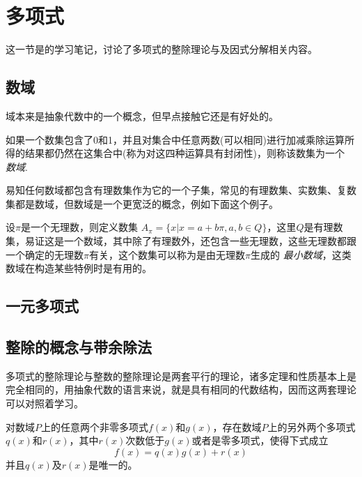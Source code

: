 
\section{多项式}
\label{sec:polynome}

这一节是\cite{advanced-algebra}的学习笔记，讨论了多项式的整除理论与及因式分解相关内容。

\subsection{数域}
\label{sec:number-field}

域本来是抽象代数中的一个概念，但早点接触它还是有好处的。

\begin{definition}
  如果一个数集包含了0和1，并且对集合中任意两数(可以相同)进行加减乘除运算所得的结果都仍然在这集合中(称为对这四种运算具有封闭性)，则称该数集为一个 \emph{数域}.
\end{definition}

易知任何数域都包含有理数集作为它的一个子集，常见的有理数集、实数集、复数集都是数域，但数域是一个更宽泛的概念，例如下面这个例子。

\begin{example}
  设$\pi$是一个无理数，则定义数集 $A_{\pi} = \{x|x=a+b\pi,a,b\in Q\}$，这里$Q$是有理数集，易证这是一个数域，其中除了有理数外，还包含一些无理数，这些无理数都跟一个确定的无理数$\pi$有关，这个数集可以称为是由无理数$\pi$生成的 \emph{最小数域}，这类数域在构造某些特例时是有用的。
\end{example}

\subsection{一元多项式}
\label{sec:polynome-with-one-variable}



\subsection{整除的概念与带余除法}
\label{sec:polynome-integer-division-and-devision-with-remainder}

多项式的整除理论与整数的整除理论是两套平行的理论，诸多定理和性质基本上是完全相同的，用抽象代数的语言来说，就是具有相同的代数结构，因而这两套理论可以对照着学习。

\begin{theorem}[带余除法]
  对数域$P$上的任意两个非零多项式$f(x)$和$g(x)$，存在数域$P$上的另外两个多项式$q(x)$和$r(x)$，其中$r(x)$次数低于$g(x)$或者是零多项式，使得下式成立
  \[ f(x) = q(x) g(x) + r(x) \]
  并且$q(x)$及$r(x)$是唯一的。
\end{theorem}

